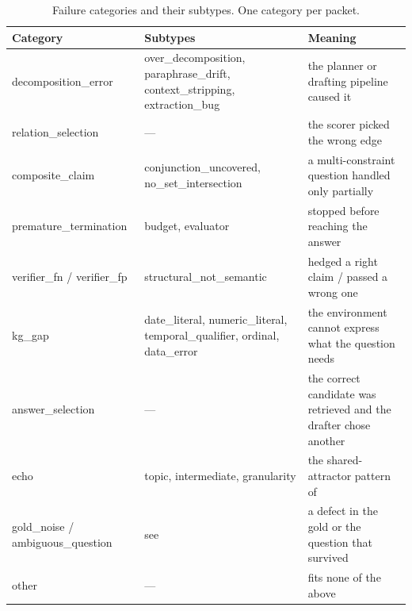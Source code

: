 \begin{table}[!htb]
  \begin{center}
    \caption[Failure categories and their subtypes]{Failure categories and their
    subtypes. One category per packet.}
    \label{tab:census-schema}
    \footnotesize
    \begin{tabular}{|l|L{42mm}|L{45mm}|}
      \hline
      \textbf{Category} & \textbf{Subtypes} & \textbf{Meaning} \\
      \hline
      \textsf{decomposition\_error} &
      \textsf{over\_decomposition}, \textsf{paraphrase\_drift},
      \textsf{context\_stripping}, \textsf{extraction\_bug} &
      the planner or drafting pipeline caused it \\
      \hline
      \textsf{relation\_selection} & --- &
      the scorer picked the wrong edge \\
      \hline
      \textsf{composite\_claim} &
      \textsf{conjunction\_uncovered}, \textsf{no\_set\_intersection} &
      a multi-constraint question handled only partially \\
      \hline
      \textsf{premature\_termination} & \textsf{budget}, \textsf{evaluator} &
      stopped before reaching the answer \\
      \hline
      \textsf{verifier\_fn} / \textsf{verifier\_fp} &
      \textsf{structural\_not\_semantic} &
      hedged a right claim / passed a wrong one \\
      \hline
      \textsf{kg\_gap} &
      \textsf{date\_literal}, \textsf{numeric\_literal},
      \textsf{temporal\_qualifier}, \textsf{ordinal}, \textsf{data\_error} &
      the environment cannot express what the question needs \\
      \hline
      \textsf{answer\_selection} & --- &
      the correct candidate was retrieved and the drafter chose another \\
      \hline
      \textsf{echo} &
      \textsf{topic}, \textsf{intermediate}, \textsf{granularity} &
      the shared-attractor pattern of  \\
      \hline
      \textsf{gold\_noise} / \textsf{ambiguous\_question} &
      see  &
      a defect in the gold or the question that survived
       \\
      \hline
      \textsf{other} & --- & fits none of the above \\
      \hline
    \end{tabular}
  \end{center}
\end{table}

